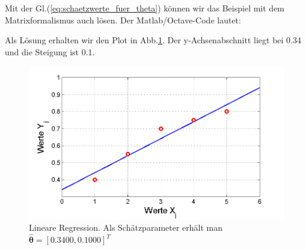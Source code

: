 Mit der Gl.(\ref{eq:schaetzwerte_fuer_theta}) können wir 
das Beispiel mit dem Matrixformalismus auch lösen. 
Der Matlab/Octave-Code lautet: 


Als Lösung erhalten wir den Plot in Abb.\ref{fig:LineareRegression}.
Der y-Achsenabschnitt liegt bei 0.34 und die Steigung ist 0.1.
\begin{figure}[!htp]
	\begin{center}
		\includegraphics[width=140mm]{02_vorlesung/media/LinRegression.png}
		\caption{Lineare Regression. 
			Als Schätzparameter erhält man $\hat{\boldsymbol\theta} = [ 0.3400 ,0.1000 ]^T$}
		\label{fig:LineareRegression}
	\end{center}
\end{figure}

